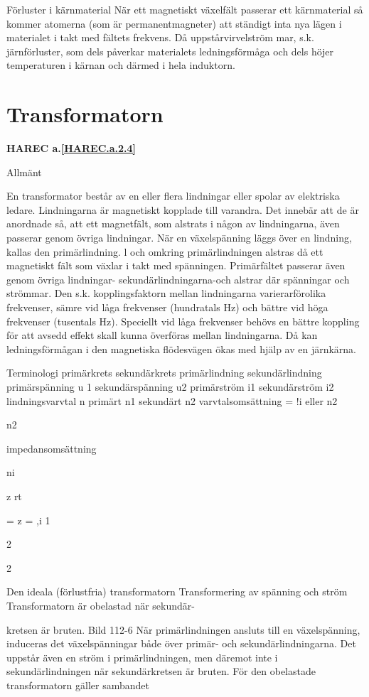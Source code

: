 {Förluster i kärnmaterial
När ett magnetiskt växelfält passerar ett
kärnmaterial så kommer atomerna (som är
permanentmagneter) att ständigt inta nya
lägen i materialet i takt med fältets frekvens.
Då uppstårvirvelström mar, s.k. järnförluster,
som dels påverkar materialets ledningsförmåga och dels höjer temperaturen i kärnan och därmed i hela induktorn.

\section{Transformatorn}
\textbf{HAREC a.\ref{HAREC.a.2.4}\label{myHAREC.a.2.4}}

Allmänt

En transformator består av en eller flera
lindningar eller spolar av elektriska ledare.
Lindningarna är magnetiskt kopplade till varandra. Det innebär att de är anordnade så,
att ett magnetfält, som alstrats i någon av
lindningarna, även passerar genom övriga
lindningar.
När en växelspänning läggs över en lindning, kallas den primärlindning. l och omkring primärlindningen alstras då ett magnetiskt fält som växlar i takt med spänningen.
Primärfältet passerar även genom övriga
lindningar- sekundärlindningarna-och alstrar där spänningar och strömmar.
Den s.k. kopplingsfaktorn mellan lindningarna varierarförolika frekvenser, sämre
vid låga frekvenser (hundratals Hz) och bättre vid höga frekvenser (tusentals Hz). Speciellt vid låga frekvenser behövs en bättre
koppling för att avsedd effekt skall kunna
överföras mellan lindningarna. Då kan ledningsförmågan i den magnetiska flödesvägen ökas med hjälp av en järnkärna.

Terminologi
primärkrets
sekundärkrets
primärlindning
sekundärlindning
primärspänning u 1 sekundärspänning u2
primärström i1
sekundärström i2
lindningsvarvtal n primärt n1 sekundärt n2
varvtalsomsättning = !i eller n2

n2

impedansomsättning

ni

z rt

= z = ,i
1

2

2

Den ideala (förlustfria) transformatorn
Transformering av spänning och ström
Transformatorn är obelastad när sekundär-

kretsen är bruten.
Bild 112-6
När primärlindningen ansluts till en växelspänning, induceras det växelspänningar
både över primär- och sekundärlindningarna. Det uppstår även en ström i primärlindningen, men däremot inte i sekundärlindningen när sekundärkretsen är bruten. För
den obelastade transformatorn gäller sambandet

}
